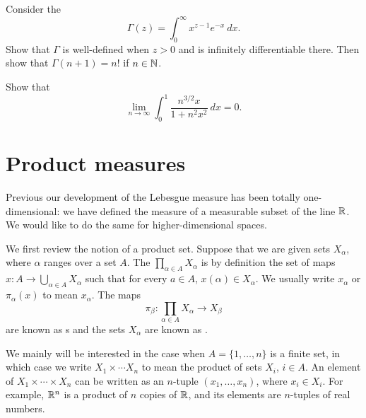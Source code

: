 \begin{exercise}
Consider the 
\[\Gamma(z) = \int_0^{\infty} x^{z - 1} e^{-x} ~dx.\]
Show that $\Gamma$ is well-defined when $z > 0$ and is infinitely differentiable there. Then show that $\Gamma(n + 1) = n!$ if $n \in \mathbb{N}$.
\end{exercise}

\begin{exercise}
Show that
\[\lim_{n \to \infty} \int_0^1 \frac{n^{3/2}x}{1 + n^2x^2} ~dx = 0.\]
\end{exercise}

\section{Product measures}
Previous our development of the Lebesgue measure has been totally one-dimensional: we have defined the measure of a measurable subset of the line $\mathbb{R}$.
We would like to do the same for higher-dimensional spaces.

We first review the notion of a product set. Suppose that we are given sets $X_\alpha$, where $\alpha$ ranges over a set $A$.
The  $\prod_{\alpha \in A} X_\alpha$ is by definition the set of maps $x: A \to \bigcup_{\alpha \in A} X_\alpha$ such that for every $a \in A$, $x(\alpha) \in X_\alpha$.
We usually write $x_\alpha$ or $\pi_\alpha(x)$ to mean $x_\alpha$. The maps
\[\pi_\beta: \prod_{\alpha \in A} X_{\alpha} \to X_\beta\]
are known as s and the sets $X_\alpha$ are known as .

We mainly will be interested in the case when $A = \{1, \dots, n\}$ is a finite set, in which case we write $X_1 \times \cdots X_{n}$ to mean the product of sets $X_i$, $i \in A$.
An element of $X_1 \times \cdots \times X_{n}$ can be written as an $n$-tuple $(x_1, \dots, x_{n})$, where $x_{i} \in X_i$.
For example, $\mathbb{R}^n$ is a product of $n$ copies of $\mathbb{R}$, and its elements are $n$-tuples of real numbers.

